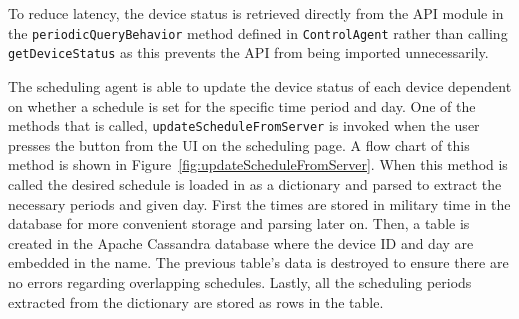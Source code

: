 \documentclass[conference]{IEEEtran}
\begin{document}
To reduce latency, the device status is retrieved directly from the API module in the \texttt{periodicQueryBehavior} method defined in \texttt{ControlAgent} rather than calling \texttt{getDeviceStatus} as this prevents the API from being imported unnecessarily.

The scheduling agent is able to update the device status of each device dependent on whether a schedule is set for the specific time period and day. One of the methods that is called, \texttt{updateScheduleFromServer} is invoked when the user presses the  button from the UI on the scheduling page. A flow chart of this method is shown in Figure~\ref{fig:updateScheduleFromServer}. When this method is called the desired schedule is loaded in as a dictionary and parsed to extract the necessary periods and given day. First the times are stored in military time in the database for more convenient storage and parsing later on. Then, a table is created in the Apache Cassandra database where the device ID and day are embedded in the name. The previous table's data is destroyed to ensure there are no errors regarding overlapping schedules. Lastly, all the scheduling periods extracted from the dictionary are stored as rows in the table. 
\end{document}
